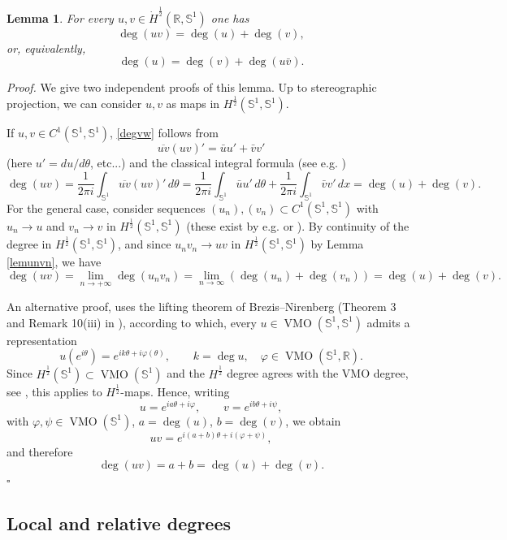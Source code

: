 \documentclass[12pt, a4paper]{article}
\newtheorem{lem}[thm]{Lemma}
\newenvironment{proof}{\noindent\emph{Proof.}}{\hfill$\square$\medskip}
\newcommand{\sph}{\mathbb{S}}
\renewcommand{\(}{\left(}
\renewcommand{\)}{\right)}
\begin{document}
\begin{lem}\label{lem:degree-additivity-product}
For every $u,v\in \dot H^{\frac12}(\mathbb R,\sph^1)$ one has
\begin{equation}\label{degvw}
        \deg(uv)=\deg(u)+\deg(v),
\end{equation}
or, equivalently,
\[
        \deg(u)=\deg(v)+\deg(u\bar v).
\]
\end{lem}

\begin{proof} We give two independent proofs of this lemma.
Up to stereographic projection, we can consider $u,v$ as maps in $H^\frac12(\sph^1,\sph^1)$. 

If $u,v\in C^1(\sph^1,\sph^1)$, \eqref{degvw} follows from
$$\overline{uv}(uv)'=\bar u u' + \bar v v'$$
(here $u'=du/d\theta$, etc...) and the classical integral formula (see e.g. \cite[Sec. 2]{HM})
\[
        \deg(uv)        =     \frac{1}{2\pi i}\int_{\sph^1}\overline{uv}(uv)'\,d\theta =        \frac{1}{2\pi i}\int_{\sph^1}\bar u u'\,d\theta        +        \frac{1}{2\pi i}\int_{\sph^1}\bar v v'\,dx=\deg(u)+\deg(v) .\]
For the general case, consider sequences $(u_n),(v_n)\subset C^1(\sph^1,\sph^1)$ with $u_n\to u$ and $v_n\to v$ in $H^\frac12(\sph^1,\sph^1)$ (these exist by e.g. \cite[Thm. 1.5]{AM} or \cite[Prop. A.2]{HM}). By continuity of the degree in $H^\frac12(\sph^1,\sph^1)$, and since $u_n v_n\to uv$ in $H^\frac12(\sph^1,\sph^1)$ by Lemma \ref{lemunvn}, we have
$$\deg(uv)=\lim_{n\to +\infty} \deg(u_nv_n)=\lim_{n\to \infty} (\deg(u_n)+\deg(v_n))=\deg(u)+\deg(v).$$

An alternative proof, uses the lifting theorem of Brezis--Nirenberg
(Theorem 3 and Remark 10(iii) in \cite{BN}), according to which, every
$u\in \operatorname{VMO}(\sph^1,\sph^1)$ admits a representation
\[
        u(e^{i\theta})=e^{ik\theta+i\varphi(\theta)},
        \qquad k=\deg u,\quad \varphi\in \operatorname{VMO}(\sph^1,\mathbb R).
\]
Since $H^{\frac12}(\sph^1)\subset \operatorname{VMO}(\sph^1)$ and the
$H^{\frac12}$ degree agrees with the VMO degree, see
\cite[Proposition 2.1]{HM}, this applies to
$H^{\frac12}$-maps. Hence, writing
\[
        u=e^{ia\theta+i\varphi},\qquad
        v=e^{ib\theta+i\psi},
\]
with $\varphi,\psi\in \operatorname{VMO}(\sph^1)$, $a=\deg(u)$, $b=\deg(v)$,  we obtain
\[
        uv=e^{i(a+b)\theta+i(\varphi+\psi)},
\]
and therefore
\[
        \deg(uv)=a+b=\deg(u)+\deg(v).
\]
\end{proof}




\subsection{Local and relative degrees}
\end{document}
